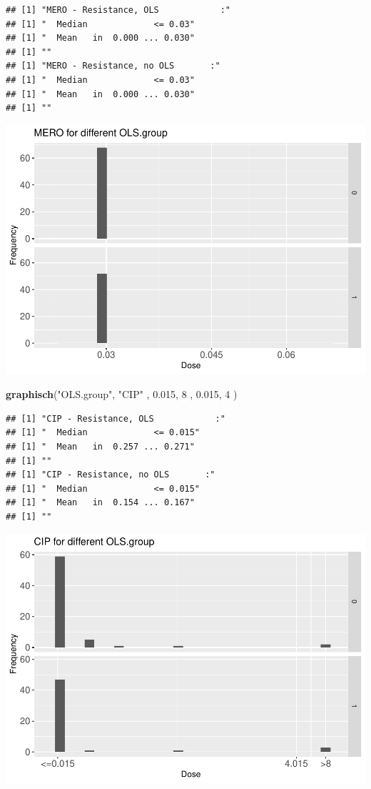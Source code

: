 \documentclass[
]{article}
\newenvironment{Shaded}{\begin{snugshade}}{\end{snugshade}}
\newcommand{\DecValTok}[1]{\textcolor[rgb]{0.00,0.00,0.81}{#1}}
\newcommand{\FloatTok}[1]{\textcolor[rgb]{0.00,0.00,0.81}{#1}}
\newcommand{\KeywordTok}[1]{\textcolor[rgb]{0.13,0.29,0.53}{\textbf{#1}}}
\newcommand{\NormalTok}[1]{#1}
\newcommand{\StringTok}[1]{\textcolor[rgb]{0.31,0.60,0.02}{#1}}
\begin{document}
\begin{verbatim}
## [1] "MERO - Resistance, OLS            :"
## [1] "  Median             <= 0.03"
## [1] "  Mean   in  0.000 ... 0.030"
## [1] ""
## [1] "MERO - Resistance, no OLS       :"
## [1] "  Median             <= 0.03"
## [1] "  Mean   in  0.000 ... 0.030"
## [1] ""
\end{verbatim}

\includegraphics{Verteilungen_files/figure-latex/unnamed-chunk-19-1.pdf}

\begin{Shaded}
\begin{Highlighting}[]
  \KeywordTok{graphisch}\NormalTok{(}\StringTok{"OLS.group"}\NormalTok{, }\StringTok{"CIP"}\NormalTok{ , }\FloatTok{0.015}\NormalTok{,   }\DecValTok{8}\NormalTok{   ,   }\FloatTok{0.015}\NormalTok{,   }\DecValTok{4}\NormalTok{     ) }
\end{Highlighting}
\end{Shaded}

\begin{verbatim}
## [1] "CIP - Resistance, OLS            :"
## [1] "  Median             <= 0.015"
## [1] "  Mean   in  0.257 ... 0.271"
## [1] ""
## [1] "CIP - Resistance, no OLS       :"
## [1] "  Median             <= 0.015"
## [1] "  Mean   in  0.154 ... 0.167"
## [1] ""
\end{verbatim}

\includegraphics{Verteilungen_files/figure-latex/unnamed-chunk-20-1.pdf}
\end{document}
